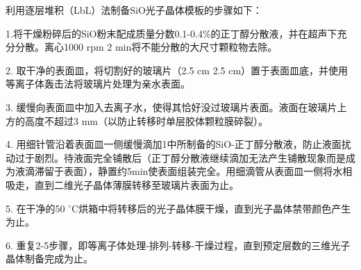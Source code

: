 利用逐层堆积（LbL）法制备SiO光子晶体模板的步骤如下：

1.将干燥粉碎后的SiO粉末配成质量分数0.1-0.4\%的正丁醇分散液，并在超声下充分分散。离心1000 rpm 2 min将不能分散的大尺寸颗粒物去除。

2. 取干净的表面皿，将切割好的玻璃片（2.5 cm \text{$\times$} 2.5 cm）置于表面皿底，并使用等离子体轰击法将玻璃片处理为亲水表面。

3. 缓慢向表面皿中加入去离子水，使得其恰好没过玻璃片表面。液面在玻璃片上方的高度不超过3 mm（以防止转移时单层胶体颗粒膜碎裂）。

4. 用细针管沿着表面皿一侧缓慢滴加1中所制备的SiO-正丁醇分散液，防止液面扰动过于剧烈。待液面完全铺散后（正丁醇分散液继续滴加无法产生铺散现象而是成为液滴滞留于表面），静置约5min使表面组装完全。用细滴管从表面皿一侧将水相吸走，直到二维光子晶体薄膜转移至玻璃片表面为止。

5. 在干净的50 $^{\circ}$C烘箱中将转移后的光子晶体膜干燥，直到光子晶体禁带颜色产生为止。

6. 重复2-5步骤，即等离子体处理-排列-转移-干燥过程，直到预定层数的三维光子晶体制备完成为止。

